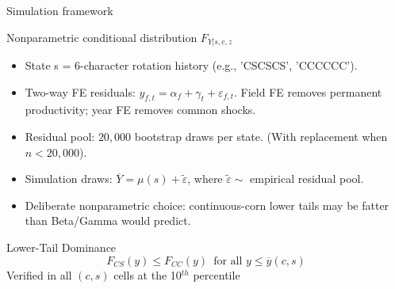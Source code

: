 \documentclass[notes, 10pt, aspectratio=169]{beamer}
\begin{document}


\begin{frame}{Simulation framework}
\begin{block}{Nonparametric conditional distribution $F_{Y|s,c,z}$}
    \begin{itemize}
        \item State s = 6-character rotation history (e.g., 'CSCSCS', 'CCCCCC').
        \item Two-way FE residuals: $y_{f,t} = \alpha_f + \gamma_t + \varepsilon_{f,t}$. Field FE removes permanent productivity; year FE removes common shocks. 
        \item Residual pool: $20,000$ bootstrap draws per state. (With replacement when $n < 20,000$).
        \item Simulation draws: $\overline{Y}=\mu(s)+\tilde{\varepsilon}$, where $\tilde{\varepsilon}\sim $ empirical residual pool.
        \item Deliberate nonparametric choice: continuous-corn lower tails may be fatter than Beta/Gamma would predict.
    \end{itemize}
\end{block}

\begin{block}{Lower-Tail Dominance}
    \begin{equation*}
        F_{CS}(y)\leq F_{CC}(y)\,\text{ for all }y\leq\overline{y}(c,s)
    \end{equation*}
    Verified in all $(c,s)$ cells at the 10$^{th}$ percentile
\end{block}
    
\end{frame}
\end{document}

